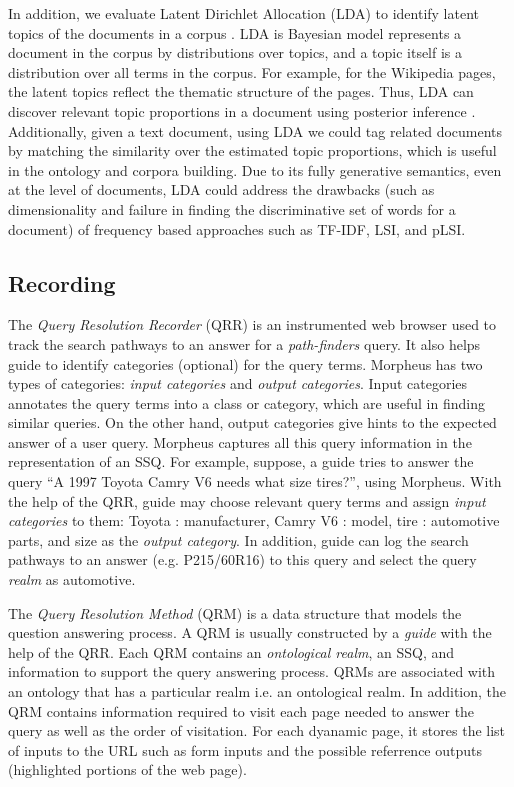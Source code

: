 In addition, we evaluate Latent Dirichlet Allocation (LDA) to identify latent topics of the documents in a corpus \cite{Blei2003latentdirichlet}.  LDA is Bayesian model represents a document in the corpus by distributions over topics, and a topic itself is a distribution over all  terms in the corpus.  For example, for the Wikipedia pages, the latent topics reflect the thematic structure of the pages. Thus, LDA can discover relevant topic proportions in a document using posterior inference \cite{Blei2003latentdirichlet}. Additionally, given a text document, using LDA we could tag related documents by matching the similarity over the estimated topic proportions, which is useful in the ontology and corpora building.  Due to its fully generative semantics, even at the level of documents, LDA could address the drawbacks (such as dimensionality and failure in finding the discriminative set of words for a document) of frequency based approaches such as TF-IDF, LSI, and pLSI.



\subsection{ Recording}
\label{sec:query_processing}
  
The \emph{Query Resolution Recorder} (QRR) is an instrumented web browser
used to track the search pathways to an answer for a \textit{path-finders} query. It
also helps guide to identify categories (optional) for the query terms. 
Morpheus has two types of categories: \emph{input categories} and \emph{output categories}.
Input categories annotates the query terms into a class or category, which are 
useful in finding similar queries. On the other hand, output categories give hints
to the expected answer of a user query. Morpheus captures all
this query information in the representation of an SSQ. For example, suppose, a guide 
tries to answer the query ``A 1997 Toyota Camry V6 needs what size tires?'', using
Morpheus. With the help of the QRR, guide may choose relevant query terms and assign
\emph{input categories} to them: Toyota : manufacturer, Camry V6 : 
model, tire : automotive parts, and size as the \emph{output category}. 
In addition, guide can log the search pathways to an answer (e.g. P215/60R16)
to this query and select the query \emph{realm} as automotive.      


The \emph{Query Resolution Method} (QRM) is a data structure that models the
question answering process. A QRM is usually constructed by a \emph{guide} with
the help of the QRR. Each QRM contains an \emph{ontological realm}, an SSQ, and
information to support the query answering process. QRMs are associated with an
ontology that has a particular realm i.e. an ontological realm. In addition, 
the QRM contains information required to visit each page needed to 
answer the query as well as the order of visitation. For each
dyanamic page, it stores the list of inputs to the URL such as form inputs and
the possible referrence outputs (highlighted portions of the web page).


